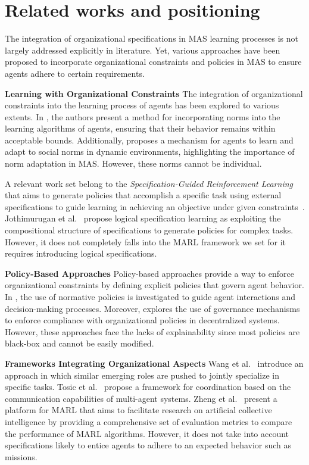 \documentclass[runningheads]{llncs}
\theoremstyle{freethm}
\theoremstyle{proofoutline}
\begin{document}
\section{Related works and positioning}\label{sec:related_works}

The integration of organizational specifications in MAS learning processes is not largely addressed explicitly in literature. Yet, various approaches have been proposed to incorporate organizational constraints and policies in MAS to ensure agents adhere to certain requirements.

\textbf{Learning with Organizational Constraints} \quad
%
The integration of organizational constraints into the learning process of agents has been explored to various extents. In \cite{cruz2020norms}, the authors present a method for incorporating norms into the learning algorithms of agents, ensuring that their behavior remains within acceptable bounds. Additionally, \cite{villatoro2011social} proposes a mechanism for agents to learn and adapt to social norms in dynamic environments, highlighting the importance of norm adaptation in MAS. However, these norms cannot be individual.

A relevant work set belong to the \emph{Specification-Guided Reinforcement Learning} that aims to generate policies that accomplish a specific task using external specifications to guide learning in achieving an objective under given constraints~\cite{Bansal2022}. Jothimurugan et al.~\cite{Jothimurugan2021} propose logical specification learning as exploiting the compositional structure of specifications to generate policies for complex tasks. However, it does not completely falls into the MARL framework we set for it requires introducing logical specifications.

\textbf{Policy-Based Approaches} \quad
%
Policy-based approaches provide a way to enforce organizational constraints by defining explicit policies that govern agent behavior. In \cite{krupanski2015norm}, the use of normative policies is investigated to guide agent interactions and decision-making processes. Moreover, \cite{vos2020governing} explores the use of governance mechanisms to enforce compliance with organizational policies in decentralized systems. However, these approaches face the lacks of explainability since most policies are black-box and cannot be easily modified.

\textbf{Frameworks Integrating Organizational Aspects} \quad
%
Wang et al.~\cite{Wang2020} introduce an approach in which similar emerging roles are pushed to jointly specialize in specific tasks. Tosic et al.~\cite{Tosic2010} propose a framework for coordination based on the communication capabilities of multi-agent systems. Zheng et al.~\cite{Zheng2018} present a platform for MARL that aims to facilitate research on artificial collective intelligence by providing a comprehensive set of evaluation metrics to compare the performance of MARL algorithms. However, it does not take into account specifications likely to entice agents to adhere to an expected behavior such as missions.
\end{document}
